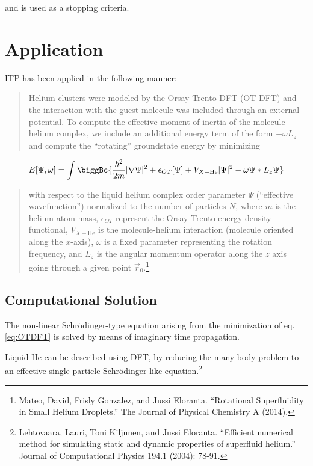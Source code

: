 and is used as a stopping criteria.

\pagebreak

\section{Application}\label{application}

ITP has been applied in the following manner:

\begin{quote}
Helium clusters were modeled by the Orsay-Trento DFT (OT-DFT) and the
interaction with the guest molecule was included through an external
potential. To compute the effective moment of inertia of the
molecule--helium complex, we include an additional energy term of the
form \(-\omega L_z\) and compute the ``rotating'' groundstate energy by
minimizing
\end{quote}

\begin{equation}
\label{eq:OTDFT}
E[\Psi,\omega]=\int\biggBc{\frac{\hbar^2}{2m}|\nabla\Psi|^2+\epsilon_{OT}[\Psi]+V_{X-\text{He}}|\Psi|^2-\omega \Psi*L_z\Psi}
\end{equation}

\begin{quote}
with respect to the liquid helium complex order parameter \(\Psi\)
(``effective wavefunction'') normalized to the number of particles
\(N\), where \(m\) is the helium atom mass, \(\epsilon_{OT}\) represent
the Orsay-Trento energy density functional, \(V_{X-\text{He}}\) is the
molecule-helium interaction (molecule oriented along the \(x\)-axis),
\(\omega\) is a fixed parameter representing the rotation frequency, and
\(L_z\) is the angular momentum operator along the \(z\) axis going
through a given point \(\vec{r}_0\).\footnote{Mateo, David, Frisly
  Gonzalez, and Jussi Eloranta. ``Rotational Superfluidity in Small
  Helium Droplets.'' The Journal of Physical Chemistry A (2014).}
\end{quote}

\subsection{Computational Solution}\label{computational-solution}

The non-linear Schrödinger-type equation arising from the minimization
of eq. \ref{eq:OTDFT} is solved by means of imaginary time propagation.

Liquid He can be described using DFT, by reducing the many-body problem
to an effective single particle Schrödinger-like equation.\footnote{Lehtovaara,
  Lauri, Toni Kiljunen, and Jussi Eloranta. ``Efficient numerical method
  for simulating static and dynamic properties of superfluid helium.''
  Journal of Computational Physics 194.1 (2004): 78-91.}

